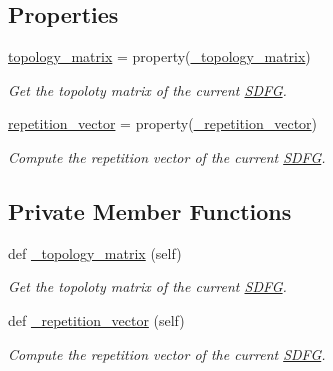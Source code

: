 \subsection*{Properties}
\begin{DoxyCompactItemize}
\item 
\hyperlink{classsylva_1_1base_1_1sdf_1_1_s_d_f_g_a5973e8ab996adf42e7fd074cdaa85fdf}{topology\+\_\+matrix} = property(\hyperlink{classsylva_1_1base_1_1sdf_1_1_s_d_f_g_a1bb270c5d255df4a78bd81650fdc80a7}{\+\_\+topology\+\_\+matrix})
\begin{DoxyCompactList}\small\item\em Get the topoloty matrix of the current \hyperlink{classsylva_1_1base_1_1sdf_1_1_s_d_f_g}{S\+D\+FG}. \end{DoxyCompactList}\item 
\hyperlink{classsylva_1_1base_1_1sdf_1_1_s_d_f_g_ad5abe5a7b0ab0941a97db69c1e00e116}{repetition\+\_\+vector} = property(\hyperlink{classsylva_1_1base_1_1sdf_1_1_s_d_f_g_a27f061deddd418fd4945acbd9c01122a}{\+\_\+repetition\+\_\+vector})
\begin{DoxyCompactList}\small\item\em Compute the repetition vector of the current \hyperlink{classsylva_1_1base_1_1sdf_1_1_s_d_f_g}{S\+D\+FG}. \end{DoxyCompactList}\end{DoxyCompactItemize}
\subsection*{Private Member Functions}
\begin{DoxyCompactItemize}
\item 
def \hyperlink{classsylva_1_1base_1_1sdf_1_1_s_d_f_g_a1bb270c5d255df4a78bd81650fdc80a7}{\+\_\+topology\+\_\+matrix} (self)
\begin{DoxyCompactList}\small\item\em Get the topoloty matrix of the current \hyperlink{classsylva_1_1base_1_1sdf_1_1_s_d_f_g}{S\+D\+FG}. \end{DoxyCompactList}\item 
def \hyperlink{classsylva_1_1base_1_1sdf_1_1_s_d_f_g_a27f061deddd418fd4945acbd9c01122a}{\+\_\+repetition\+\_\+vector} (self)
\begin{DoxyCompactList}\small\item\em Compute the repetition vector of the current \hyperlink{classsylva_1_1base_1_1sdf_1_1_s_d_f_g}{S\+D\+FG}. \end{DoxyCompactList}\end{DoxyCompactItemize}
